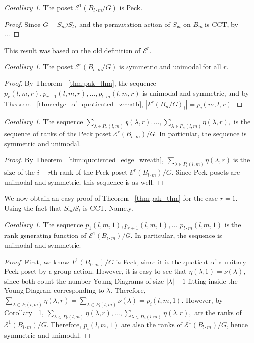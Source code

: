 \documentclass[10 pt]{amsart}
\theoremstyle{plain}
\theoremstyle{definition}
\theoremstyle{remark}
\numberwithin{equation}{section}
\newtheorem{cor}[thm]{Corollary}
\theoremstyle{remark}
\begin{document}
\begin{cor}
\label{cor:peck_wreath_1}
The poset $\mathcal E^1(B_{l\cdot m}/G)$ is Peck.
\end{cor}
\begin{proof}
Since $G = S_m \wr S_l,$ and the permutation action of $S_m$ on $B_m$ is CCT, by ...
\end{proof}

This result was based on the old definition of $\mathcal E^r.$

\begin{cor}
The poset $\mathcal E^r(B_{l\cdot m}/G)$ is symmetric and unimodal for all $r.$
\end{cor}
\begin{proof}
By Theorem ~\ref{thm:pak_thm}, the sequence $p_r(l,m,r), p_{r+1}(l,m,r),\ldots, p_{l\cdot m}(l,m,r)$ is unimodal and symmetric, and by Theorem ~\ref{thm:edge_of_quotiented_wreath}, $|\mathcal E^r(B_n/G)_i| = p_i(m,l,r).$
\end{proof}

\fi

\begin{cor}
\label{cor:unimodal_wreath_r_sequence}
The sequence $\sum_{\lambda \in P_r(l,m)} \eta(\lambda,r),\ldots,\sum_{\lambda \in P_n(l,m)} \eta(\lambda,r),$ is the sequence of ranks of the Peck poset $\mathcal E^r(B_{l\cdot m})/G.$ In particular, the sequence is symmetric and unimodal.
\end{cor}
\begin{proof}
By Theorem ~\ref{thm:quotiented_edge_wreath}, $\sum_{\lambda \in P_i(l,m)} \eta(\lambda,r)$ is the size of the $i-r$th rank of the Peck poset $\mathcal E^r(B_{l\cdot m})/G.$ Since Peck posets are unimodal and symmetric, this sequence is as well.
\end{proof}

We now obtain an easy proof of Theorem ~\ref{thm:pak_thm} for the case $r = 1.$ Using the fact that $S_m\wr S_l$ is CCT. Namely,

\begin{cor}
\label{cor:rank_gen_fn_wreath_1}
The sequence $p_1(l,m,1), p_{r+1}(l,m,1),\ldots, p_{l\cdot m}(l,m,1)$ is the rank generating function of $\mathcal E^1(B_{l\cdot m})/G.$ In particular, the sequence is unimodal and symmetric.
\end{cor}
\begin{proof}
First, we know $F^1(B_{l\cdot m})/G$ is Peck, since it is the quotient of a unitary Peck poset by a group action. However, it is easy to see that $\eta(\lambda,1) = \nu(\lambda),$ since both count the number Young Diagrams of size $|\lambda|-1$ fitting inside the Young Diagram corresponding to $\lambda.$ Therefore, $\sum_{\lambda \in P_i(l,m)} \eta(\lambda,r) = \sum_{\lambda \in P_i(l,m)}\nu(\lambda) = p_i(l,m,1).$ However, by Corollary ~\ref{cor:unimodal_wreath_r_sequence}, $\sum_{\lambda \in P_r(l,m)} \eta(\lambda,r),\ldots,\sum_{\lambda \in P_n(l,m)} \eta(\lambda,r),$ are the ranks of $\mathcal E^1(B_{l\cdot m})/G.$ Therefore, $p_i(l,m,1)$ are also the ranks of $\mathcal E^1(B_{l\cdot m})/G$, hence symmetric and unimodal.
\end{proof}
\end{document}

